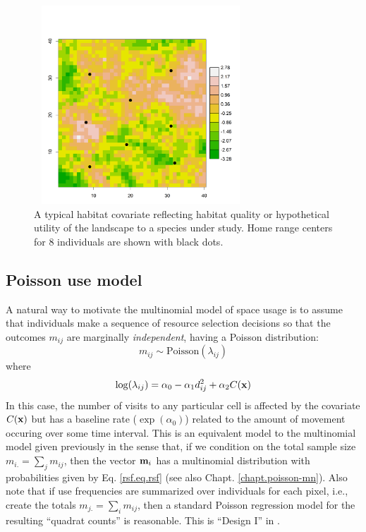 \begin{figure}[ht]
\centering
\includegraphics[width=3.15in,height=2.93in]{Ch13-RSF/figs/habitat.png}
\caption{A typical habitat covariate reflecting habitat quality or
  hypothetical utility of the landscape to a species under study. Home
  range centers for 8 individuals are shown with black dots.}
\label{rsf.fig.habitat}
\end{figure}


\subsection{Poisson use model}

A natural way to motivate the multinomial model of space usage is to
assume that individuals make a sequence of resource selection
decisions so that the outcomes $m_{ij}$ are marginally {\it
  independent}, having a Poisson distribution:
\[
 m_{ij} \sim \mbox{Poisson}( \lambda_{ij})
\]
where
\[
 \log(\lambda_{ij}) = \alpha_{0} -\alpha_{1} d_{ij}^{2} +  \alpha_{2} C({\bf x})
\]
In this case, the number of visits to any particular cell is affected
by the covariate $C({\bf x})$ but has a baseline rate ($\exp(\alpha_{0})$)
related to the amount of movement occuring over some time interval.
This is an equivalent model to the multinomial model given previously
in the sense that, if we condition on the total sample size $m_{i.} =
\sum_{j} m_{ij}$, then the vector ${\bf m}_{i}$ has a multinomial
distribution with probabilities given by Eq. \ref{rsf.eq.rsf} (see
also Chapt. \ref{chapt.poisson-mn}).  Also note that if use
frequencies are summarized over individuals for each pixel, i.e.,
create the totals $m_{j.} = \sum_i m_{ij}$, then a standard Poisson
regression model for the resulting ``quadrat counts'' is
reasonable. This is ``Design I'' in \citet{manly_etal:2002}.

